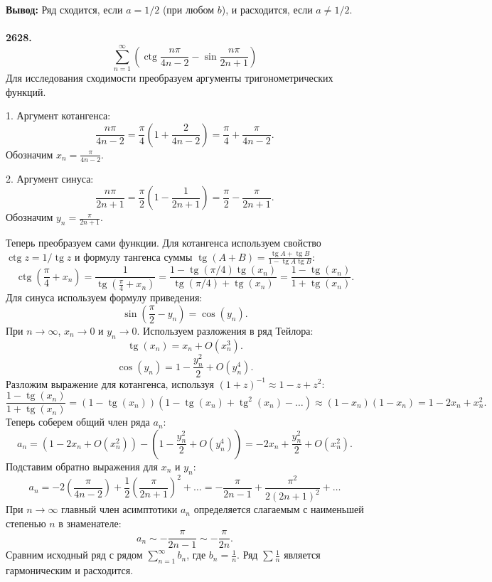 \documentclass[a4paper, 12pt]{report}
\numberwithin{equation}{section}
\begin{document}
	\textbf{Вывод:} Ряд сходится, если $a=1/2$ (при любом $b$), и расходится, если $a \neq 1/2$.
	\\\\	
	\textbf{2628.}
	$$\sum_{n=1}^{\infty} \left(\operatorname{ctg}\frac{n\pi}{4n-2} - \sin\frac{n\pi}{2n+1}\right)$$
	Для исследования сходимости преобразуем аргументы тригонометрических функций.
	
	1. Аргумент котангенса:
	$$ \frac{n\pi}{4n-2} = \frac{\pi}{4}\left(1 + \frac{2}{4n-2}\right) = \frac{\pi}{4} + \frac{\pi}{4n-2}. $$
	Обозначим $x_n = \frac{\pi}{4n-2}$.
	
	2. Аргумент синуса:
	$$ \frac{n\pi}{2n+1} = \frac{\pi}{2}\left(1 - \frac{1}{2n+1}\right) = \frac{\pi}{2} - \frac{\pi}{2n+1}. $$
	Обозначим $y_n = \frac{\pi}{2n+1}$.
	
	Теперь преобразуем сами функции.
	Для котангенса используем свойство $\operatorname{ctg} z = 1/\operatorname{tg} z$ и формулу тангенса суммы $\operatorname{tg}(A+B) = \frac{\operatorname{tg} A + \operatorname{tg} B}{1 - \operatorname{tg} A \operatorname{tg} B}$:
	$$ \operatorname{ctg}\left(\frac{\pi}{4} + x_n\right) = \frac{1}{\operatorname{tg}\left(\frac{\pi}{4} + x_n\right)} = \frac{1 - \operatorname{tg}(\pi/4)\operatorname{tg}(x_n)}{\operatorname{tg}(\pi/4)+\operatorname{tg}(x_n)} = \frac{1-\operatorname{tg}(x_n)}{1+\operatorname{tg}(x_n)}. $$
	Для синуса используем формулу приведения:
	$$ \sin\left(\frac{\pi}{2} - y_n\right) = \cos(y_n). $$
	При $n \to \infty$, $x_n \to 0$ и $y_n \to 0$. Используем разложения в ряд Тейлора:
	$$ \operatorname{tg}(x_n) = x_n + O(x_n^3). $$
	$$ \cos(y_n) = 1 - \frac{y_n^2}{2} + O(y_n^4). $$
	Разложим выражение для котангенса, используя $(1+z)^{-1} \approx 1-z+z^2$:
	$$ \frac{1-\operatorname{tg}(x_n)}{1+\operatorname{tg}(x_n)} = (1-\operatorname{tg}(x_n))(1-\operatorname{tg}(x_n)+\operatorname{tg}^2(x_n)-\dots) \approx (1-x_n)(1-x_n) = 1 - 2x_n + x_n^2. $$
	Теперь соберем общий член ряда $a_n$:
	$$ a_n = \left(1 - 2x_n + O(x_n^2)\right) - \left(1 - \frac{y_n^2}{2} + O(y_n^4)\right) = -2x_n + \frac{y_n^2}{2} + O(x_n^2). $$
	Подставим обратно выражения для $x_n$ и $y_n$:
	$$ a_n = -2\left(\frac{\pi}{4n-2}\right) + \frac{1}{2}\left(\frac{\pi}{2n+1}\right)^2 + \dots = -\frac{\pi}{2n-1} + \frac{\pi^2}{2(2n+1)^2} + \dots $$
	При $n \to \infty$ главный член асимптотики $a_n$ определяется слагаемым с наименьшей степенью $n$ в знаменателе:
	$$ a_n \sim -\frac{\pi}{2n-1} \sim -\frac{\pi}{2n}. $$
	Сравним исходный ряд с рядом $\sum_{n=1}^{\infty} b_n$, где $b_n = \frac{1}{n}$. Ряд $\sum \frac{1}{n}$ является гармоническим и расходится.
\end{document}
